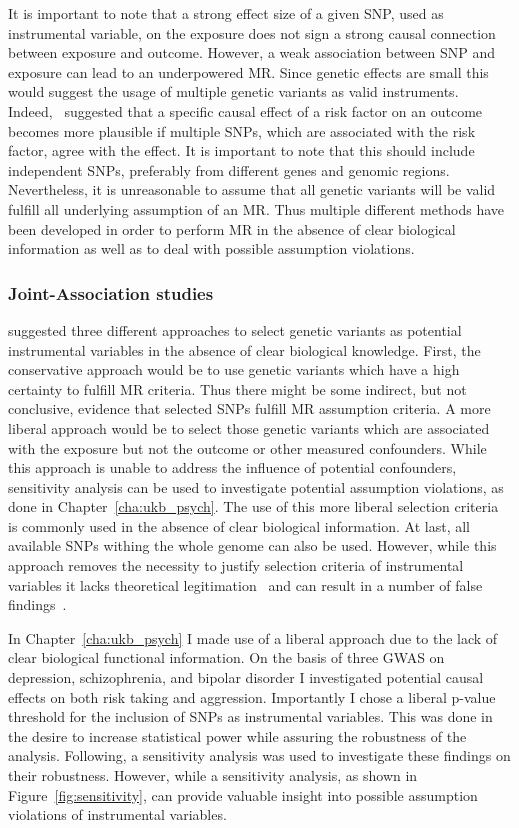 It is important to note that a strong effect size of a given SNP, used as instrumental variable, on the exposure does not sign a strong causal connection between exposure and outcome.
However, a weak association between SNP and exposure can lead to an underpowered MR\@.
Since genetic effects are small this would suggest the usage of multiple genetic variants as valid instruments.
Indeed,~\citet{Burgess2016a} suggested that a specific causal effect of a risk factor on an outcome becomes more plausible if multiple SNPs, which are associated with the risk factor, agree with the effect.
It is important to note that this should include independent SNPs, preferably from different genes and genomic regions.
Nevertheless, it is unreasonable to assume that all genetic variants will be valid fulfill all underlying assumption of an MR\@.
Thus multiple different methods have been developed in order to perform MR in the absence of clear biological information as well as to deal with possible assumption violations.

\subsubsection{Joint-Association studies}
\label{ssub:sensitivity_analysis}

\citet{Burgess2016a} suggested three different approaches to select genetic variants as potential instrumental  variables in the absence of clear biological knowledge.
First, the conservative approach would be to use genetic variants which have a high certainty to fulfill MR criteria.
Thus there might be some indirect, but not conclusive, evidence that selected SNPs fulfill MR assumption criteria.
A more liberal approach would be to select those genetic variants which are associated with the exposure but not the outcome or other measured confounders.
While this approach is unable to address the influence of potential confounders, sensitivity analysis can be used to investigate potential assumption violations, as done in Chapter~\ref{cha:ukb_psych}.
The use of this more liberal selection criteria is commonly used in the absence of clear biological information.
At last, all available SNPs withing the whole genome can also be used.
However, while this approach removes the necessity to justify  selection criteria of instrumental variables it lacks theoretical legitimation~\cite{Burgess2016a} and can result in a number of false findings~\cite{Evans2013}.

In Chapter~\ref{cha:ukb_psych} I made use of a liberal approach due to the lack of clear biological functional information.
On the basis of three GWAS on depression, schizophrenia, and bipolar disorder I investigated potential causal effects on both risk taking and aggression.
Importantly I chose a liberal p-value threshold for the inclusion of SNPs as instrumental variables.
This was done in the desire to increase statistical power while assuring the robustness of the analysis.
Following, a sensitivity analysis was used to investigate these findings on their robustness.
However, while a sensitivity analysis, as shown in Figure~\ref{fig:sensitivity}, can provide valuable insight into possible assumption violations of instrumental variables.

